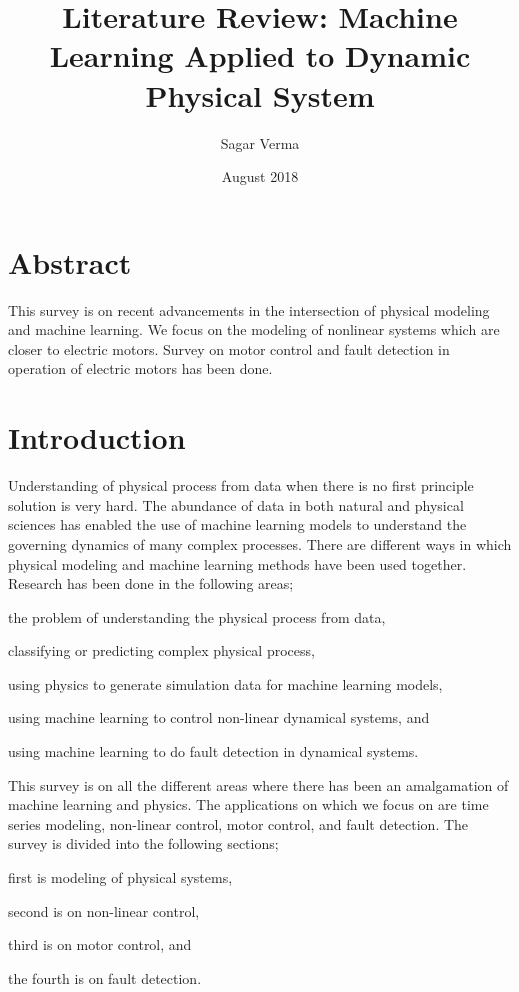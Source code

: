 \documentclass[conference]{IEEEtran}
\begin{document}
\title{Literature Review: Machine Learning Applied to Dynamic Physical System}
\author{Sagar Verma}
\date{August 2018}

\maketitle

\section{Abstract}
This survey is on recent advancements in the intersection of physical modeling and machine learning. We focus on the modeling of nonlinear systems which are closer to electric motors. Survey on motor control and fault detection in operation of electric motors has been done. \\

\section{Introduction}
Understanding of physical process from data when there is no first principle solution is very hard. The abundance of data in both natural and physical sciences has enabled the use of machine learning models to understand the governing dynamics of many complex processes. There are different ways in which physical modeling and machine learning methods have been used together. Research has been done in the following areas; \begin{enumerate*} [label=\itshape\alph*\upshape)] \item the problem of understanding the physical process from data, \item classifying or predicting complex physical process, \item using physics to generate simulation data for machine learning models, \item using machine learning to control non-linear dynamical systems, and \item using machine learning to do fault detection in dynamical systems. \end{enumerate*}

This survey is on all the different areas where there has been an amalgamation of machine learning and physics. The applications on which we focus on are time series modeling, non-linear control, motor control, and fault detection. The survey is divided into the following sections; \begin{enumerate*}[label=\itshape\roman*\upshape)]  \setcounter{enumi}{2} \item first is modeling of physical systems, \item second is on non-linear control, \item third is on motor control, and \item the fourth is on fault detection. \end{enumerate*} \\
\end{document}
